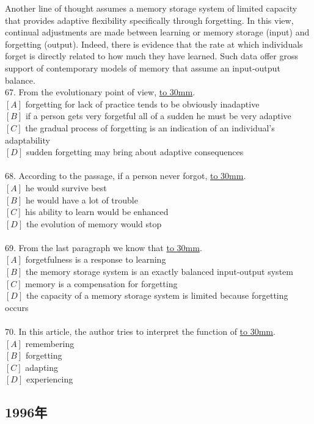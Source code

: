 \documentclass[a4paper]{article}
\begin{document}
\par
Another line of thought assumes a memory storage system of limited capacity that provides adaptive flexibility specifically through forgetting. In this view, continual adjustments are made between learning or memory storage (input) and forgetting (output). Indeed, there is evidence that the rate at which individuals forget is directly related to how much they have learned. Such data offer gross support of contemporary models of memory that assume an input-output balance.
\\67.	From the evolutionary point of view, \underline{\hbox to 30mm{}}.\\$[A]$ forgetting for lack of practice tends to be obviously inadaptive\\$[B]$ if a person gets very forgetful all of a sudden he must be very adaptive\\$[C]$ the gradual process of forgetting is an indication of an individual’s adaptability\\$[D]$ sudden forgetting may bring about adaptive consequences\\\\68.	According to the passage, if a person never forgot, \underline{\hbox to 30mm{}}.\\$[A]$ he would survive best\\$[B]$ he would have a lot of trouble\\$[C]$ his ability to learn would be enhanced\\$[D]$ the evolution of memory would stop\\\\69.	From the last paragraph we know that \underline{\hbox to 30mm{}}.\\$[A]$ forgetfulness is a response to learning\\$[B]$ the memory storage system is an exactly balanced input-output system\\$[C]$ memory is a compensation for forgetting\\$[D]$ the capacity of a memory storage system is limited because forgetting occurs\\\\70.	In this article, the author tries to interpret the function of \underline{\hbox to 30mm{}}.\\$[A]$ remembering\\$[B]$ forgetting\\$[C]$ adapting\\$[D]$ experiencing\\\subsection{1996年}
\end{document}
